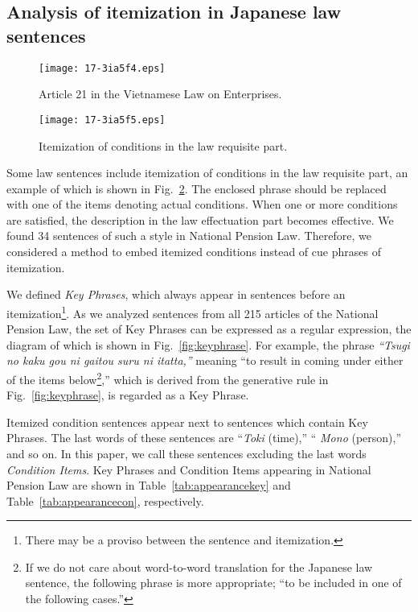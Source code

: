 \documentclass[english]{jnlp_1.4}
\begin{document}
\subsection{Analysis of itemization in Japanese law sentences}
\label{sec:analysis_japanese}


\begin{figure}[b]
\begin{center}
\texttt{[image: 17-3ia5f4.eps]}
\end{center}
\caption{Article 21 in the Vietnamese Law on Enterprises.}
\label{fig:art21}
\end{figure}
\begin{figure}[b]
\begin{center}
\texttt{[image: 17-3ia5f5.eps]}
\end{center}
\caption{Itemization of conditions in the law requisite part.}
\label{fig:itemization}
\end{figure}

Some law sentences include itemization of conditions in the law
requisite part, an example of which is shown in Fig.~\ref{fig:itemization}. 
The enclosed phrase should be replaced with one of the items
denoting actual conditions.
When one or more conditions are satisfied, the description in the law
effectuation part becomes effective.
We found 34 sentences of such a style in National Pension Law.
Therefore, we considered a method to embed itemized conditions
instead of cue phrases of itemization.

We defined \textit{Key Phrases}, which always appear in sentences before
an itemization\footnote{There may be a proviso between the sentence and
itemization.}.
As we analyzed sentences from all 215 articles of the National Pension
Law, the set of Key Phrases can be expressed as a regular expression,
the diagram of which is shown in Fig.~\ref{fig:keyphrase}.
For example, the phrase \textit{``Tsugi no kaku gou ni gaitou suru ni
itatta,''} meaning ``to result in coming under either of the items
below\footnote{If we do not care about word-to-word translation for the
Japanese law sentence, the following phrase is more appropriate; ``to be
included in one of the following cases.''},'' which is derived from the
generative rule in Fig.~\ref{fig:keyphrase}, is regarded as a Key Phrase.

Itemized condition sentences appear next to sentences which contain Key Phrases.
The last words of these sentences are ``{\it Toki} (time),'' ``{\it
Mono} (person),'' and so on.
In this paper, we call these sentences excluding the last words \textit{Condition Items}.
Key Phrases and Condition Items appearing in National Pension Law are
shown in Table~\ref{tab:appearancekey} and
Table~\ref{tab:appearancecon}, respectively.
\end{document}
